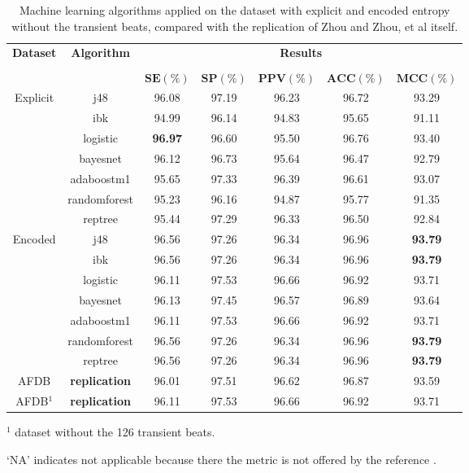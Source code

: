 \begin{table}[h]
\begin{center}
\begin{threeparttable}
\caption{Machine learning algorithms applied on the dataset with explicit and encoded entropy without the transient beats, compared with the replication of Zhou and Zhou, et al \cite[p. 7]{zhou2015} itself.}
\label{table:zhou_hr_and_unimol_126}
\scriptsize
  \begin{tabular}{c c c c c c c}
  \toprule
  \textbf{Dataset} & \textbf{Algorithm} & \multicolumn{5}{c}{\textbf{Results}} \\
  \cline{3-7}
  \\
  & & $\mathbf{SE(\%)}$ & $\mathbf{SP(\%)}$ & $\mathbf{PPV(\%)}$ & $\mathbf{ACC(\%)}$ & $\mathbf{MCC(\%)}$\\
  \midrule  
  Explicit & j48 & 96.08 & 97.19 & 96.23 & 96.72 & 93.29 \\
  & ibk & 94.99 & 96.14 & 94.83 & 95.65 & 91.11 \\
  & logistic & \textbf{96.97} & 96.60 & 95.50 & 96.76 & 93.40 \\
  & bayesnet & 96.12 & 96.73 & 95.64 & 96.47 & 92.79 \\
  & adaboostm1 & 95.65 & 97.33 & 96.39 & 96.61 & 93.07 \\
  & randomforest & 95.23 & 96.16 & 94.87 & 95.77 & 91.35 \\
  & reptree & 95.44 & 97.29 & 96.33 & 96.50 & 92.84 \\
  \hline
  Encoded & j48 & 96.56 & 97.26 & 96.34 & 96.96 & \textbf{93.79} \\
  & ibk & 96.56 & 97.26 & 96.34 & 96.96 & \textbf{93.79} \\
  & logistic & 96.11 & 97.53 & 96.66 & 96.92 & 93.71 \\
  & bayesnet & 96.13 & 97.45 & 96.57 & 96.89 & 93.64 \\
  & adaboostm1 & 96.11 & 97.53 & 96.66 & 96.92 & 93.71 \\
  & randomforest & 96.56 & 97.26 & 96.34 & 96.96 & \textbf{93.79} \\
  & reptree & 96.56 & 97.26 & 96.34 & 96.96 & \textbf{93.79} \\
  \hline
  AFDB & \textbf{replication} & 96.01 & 97.51 & 96.62 & 96.87 & 93.59 \\
  \hline
  AFDB$^1$ & \textbf{replication} & 96.11 & 97.53 & 96.66 & 96.92 & 93.71 \\
  \bottomrule
\end{tabular}
\begin{tablenotes}
	\item $^1$ dataset without the 126 transient beats.
 	\item ‘NA’ indicates not applicable because there the metric is not offered by the reference \cite{zhou2015}.
    \end{tablenotes}
\end{threeparttable}
\end{center}
\end{table}
